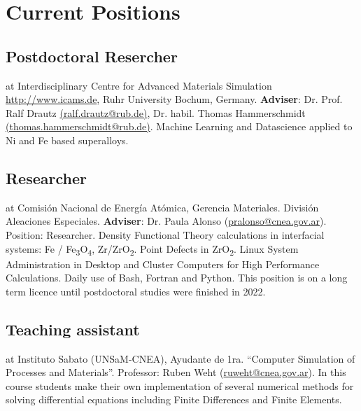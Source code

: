 \section{Current Positions}

\subsection{Postdoctoral Resercher} at Interdisciplinary Centre for Advanced Materials Simulation
\href{(ICAMS)}{http://www.icams.de}, Ruhr University Bochum, Germany.
\textbf{Adviser}: Dr. Prof. Ralf Drautz \href{mailto:ralf.drautz@rub.de}{(ralf.drautz@rub.de)}, 
Dr. habil. Thomas Hammerschmidt \href{mailto:thomas.hammerschmidt@rub.de}{(thomas.hammerschmidt@rub.de)}. 
Machine Learning and Datascience applied to Ni and Fe based superalloys. 

\subsection{ Researcher} at Comisión Nacional de Energía Atómica,  Gerencia
Materiales. División Aleaciones Especiales. \textbf{Adviser}: Dr. Paula Alonso
(\url{pralonso@cnea.gov.ar}). Position: Researcher. Density Functional Theory
calculations in interfacial systems: Fe /
Fe\textsubscript{3}O\textsubscript{4}, Zr/ZrO\textsubscript{2}. Point Defects
in ZrO\textsubscript{2}. Linux System Administration in Desktop and Cluster
Computers for High Performance Calculations. Daily use of Bash, Fortran and
Python. This position is on a long term licence until postdoctoral studies were
finished in 2022.

\subsection{Teaching assistant} at Instituto Sabato (UNSaM-CNEA), Ayudante de
1ra. “Computer Simulation of Processes and Materials”. Professor: Ruben Weht
(\url{ruweht@cnea.gov.ar}). In this course students make their own
implementation of several numerical methods for solving differential equations
including Finite Differences and Finite Elements.
